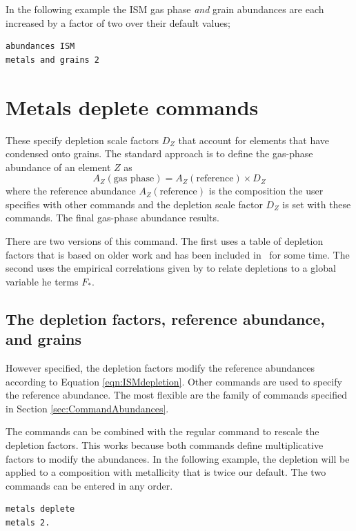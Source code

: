 In the following example the ISM gas phase \emph{and}
grain abundances are each
increased by a factor of two over their default values;
\begin{verbatim}
abundances ISM
metals and grains 2
\end{verbatim}

\section{Metals deplete commands}

These  specify depletion scale factors  $D_Z$ that account for elements that
have condensed onto grains.  
The standard approach is to define the gas-phase abundance of an element $Z$ as
\begin{equation}
A_Z( \textrm{gas phase}) = A_Z( \textrm{reference}) \times  D_Z
\label{eqn:ISMdepletion}
\end{equation}
where the reference abundance $ A_Z( \textrm{reference})$ is the composition the user specifies with other commands
and the depletion scale factor $D_Z$ is set with these commands.
The final gas-phase abundance results.

There are two versions of this command.
The first uses a table of depletion factors that is based on older work and
has been included in \Cloudy\ for some time.
The second uses the empirical correlations given by
\citet{2009ApJ...700.1299J} to relate depletions to a global variable he terms $F_*$.

\subsection{The depletion factors, reference abundance, and grains}

However specified, the depletion factors modify the reference abundances according
to Equation \ref{eqn:ISMdepletion}.
Other commands are used to specify the reference abundance.
The most flexible are the  family of commands specified
in Section \ref{sec:CommandAbundances}.

The  commands can 
be combined with the regular  command to rescale the
depletion factors. This works because both commands define multiplicative
factors to modify the abundances. In the following example, the depletion
will be applied to a composition with metallicity that is twice our default. 
The two  commands can be entered in any order.
\begin{verbatim}
metals deplete
metals 2.
\end{verbatim}


